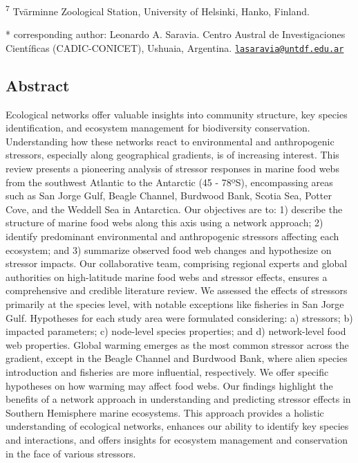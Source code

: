 \documentclass[
]{article}
\begin{document}
\textsuperscript{7} Tvärminne Zoological Station, University of
Helsinki, Hanko, Finland.

* corresponding author: Leonardo A. Saravia. Centro Austral de
Investigaciones Científicas (CADIC-CONICET), Ushuaia, Argentina.
\href{mailto:lasaravia@untdf.edu.ar}{\nolinkurl{lasaravia@untdf.edu.ar}}

\hypertarget{abstract}{%
\subsection{Abstract}\label{abstract}}

Ecological networks offer valuable insights into community structure,
key species identification, and ecosystem management for biodiversity
conservation. Understanding how these networks react to environmental
and anthropogenic stressors, especially along geographical gradients, is
of increasing interest. This review presents a pioneering analysis of
stressor responses in marine food webs from the southwest Atlantic to
the Antarctic (45 - 78ºS), encompassing areas such as San Jorge Gulf,
Beagle Channel, Burdwood Bank, Scotia Sea, Potter Cove, and the Weddell
Sea in Antarctica. Our objectives are to: 1) describe the structure of
marine food webs along this axis using a network approach; 2) identify
predominant environmental and anthropogenic stressors affecting each
ecosystem; and 3) summarize observed food web changes and hypothesize on
stressor impacts. Our collaborative team, comprising regional experts
and global authorities on high-latitude marine food webs and stressor
effects, ensures a comprehensive and credible literature review. We
assessed the effects of stressors primarily at the species level, with
notable exceptions like fisheries in San Jorge Gulf. Hypotheses for each
study area were formulated considering: a) stressors; b) impacted
parameters; c) node-level species properties; and d) network-level food
web properties. Global warming emerges as the most common stressor
across the gradient, except in the Beagle Channel and Burdwood Bank,
where alien species introduction and fisheries are more influential,
respectively. We offer specific hypotheses on how warming may affect
food webs. Our findings highlight the benefits of a network approach in
understanding and predicting stressor effects in Southern Hemisphere
marine ecosystems. This approach provides a holistic understanding of
ecological networks, enhances our ability to identify key species and
interactions, and offers insights for ecosystem management and
conservation in the face of various stressors.
\end{document}
